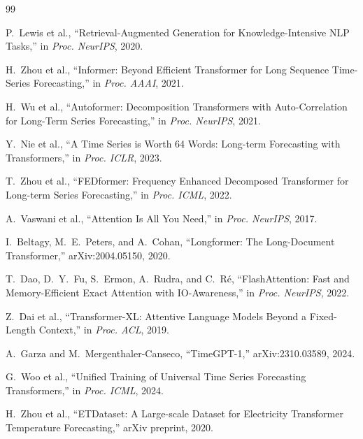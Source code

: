 \documentclass[10pt,twocolumn,letterpaper]{article}
\begin{document}

\begin{thebibliography}{99}

P.~Lewis et al.,
``Retrieval-Augmented Generation for Knowledge-Intensive NLP Tasks,''
in \emph{Proc. NeurIPS}, 2020.

H.~Zhou et al.,
``Informer: Beyond Efficient Transformer for Long Sequence Time-Series Forecasting,''
in \emph{Proc. AAAI}, 2021.

H.~Wu et al.,
``Autoformer: Decomposition Transformers with Auto-Correlation for Long-Term Series Forecasting,''
in \emph{Proc. NeurIPS}, 2021.

Y.~Nie et al.,
``A Time Series is Worth 64 Words: Long-term Forecasting with Transformers,''
in \emph{Proc. ICLR}, 2023.

T.~Zhou et al.,
``FEDformer: Frequency Enhanced Decomposed Transformer for Long-term Series Forecasting,''
in \emph{Proc. ICML}, 2022.

A.~Vaswani et al.,
``Attention Is All You Need,''
in \emph{Proc. NeurIPS}, 2017.

I.~Beltagy, M.~E.~Peters, and A.~Cohan,
``Longformer: The Long-Document Transformer,''
arXiv:2004.05150, 2020.

T.~Dao, D.~Y.~Fu, S.~Ermon, A.~Rudra, and C.~R\'{e},
``FlashAttention: Fast and Memory-Efficient Exact Attention with IO-Awareness,''
in \emph{Proc. NeurIPS}, 2022.

Z.~Dai et al.,
``Transformer-XL: Attentive Language Models Beyond a Fixed-Length Context,''
in \emph{Proc. ACL}, 2019.

A.~Garza and M.~Mergenthaler-Canseco,
``TimeGPT-1,''
arXiv:2310.03589, 2024.

G.~Woo et al.,
``Unified Training of Universal Time Series Forecasting Transformers,''
in \emph{Proc. ICML}, 2024.

H.~Zhou et al.,
``ETDataset: A Large-scale Dataset for Electricity Transformer Temperature Forecasting,''
arXiv preprint, 2020.

\end{thebibliography}

\appendix
\end{document}

